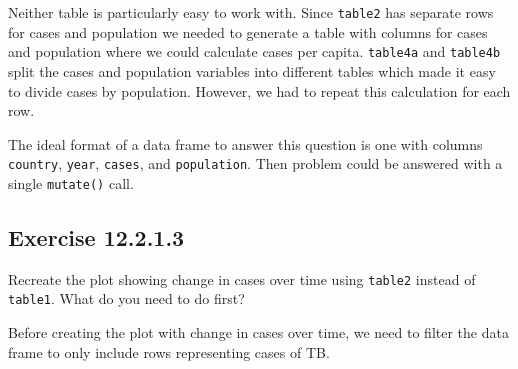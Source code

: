 \documentclass[]{book}
\newenvironment{Shaded}{\begin{snugshade}}{\end{snugshade}}
\newcommand{\CommentTok}[1]{\textcolor[rgb]{0.56,0.35,0.01}{\textit{#1}}}
\newcommand{\DataTypeTok}[1]{\textcolor[rgb]{0.13,0.29,0.53}{#1}}
\newcommand{\DecValTok}[1]{\textcolor[rgb]{0.00,0.00,0.81}{#1}}
\newcommand{\KeywordTok}[1]{\textcolor[rgb]{0.13,0.29,0.53}{\textbf{#1}}}
\newcommand{\NormalTok}[1]{#1}
\newcommand{\OperatorTok}[1]{\textcolor[rgb]{0.81,0.36,0.00}{\textbf{#1}}}
\newcommand{\StringTok}[1]{\textcolor[rgb]{0.31,0.60,0.02}{#1}}
\theoremstyle{plain}
\theoremstyle{remark}
\begin{document}
\begin{Shaded}
\end{Shaded}

Neither table is particularly easy to work with. Since \texttt{table2}
has separate rows for cases and population we needed to generate a table
with columns for cases and population where we could calculate cases per
capita. \texttt{table4a} and \texttt{table4b} split the cases and
population variables into different tables which made it easy to divide
cases by population. However, we had to repeat this calculation for each
row.

The ideal format of a data frame to answer this question is one with
columns \texttt{country}, \texttt{year}, \texttt{cases}, and
\texttt{population}. Then problem could be answered with a single
\texttt{mutate()} call.

\hypertarget{exercise-12.2.1.3}{%
\subsection*{\texorpdfstring{Exercise
{12.2.1.3}}{Exercise 12.2.1.3}}\label{exercise-12.2.1.3}}

Recreate the plot showing change in cases over time using
\texttt{table2} instead of \texttt{table1}. What do you need to do
first?

Before creating the plot with change in cases over time, we need to
filter the data frame to only include rows representing cases of TB.
\end{document}
